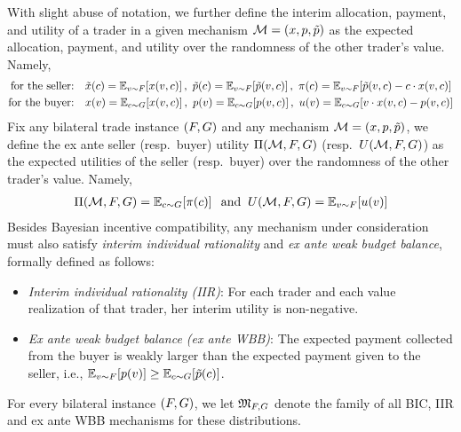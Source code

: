 With slight abuse of notation, we further define the interim allocation, payment, and utility of a trader in a given mechanism $\mathcal{M} = (x, p, \tilde{p})$ as the expected allocation, payment, and utility over the randomness of the other trader's value. Namely,
\begin{align*}
    \text{for the seller:}
    \quad
    &\selleralloc(\cost) = \expect[\val\sim\buyerdist]{\alloc(\val, \cost)},~
    \sellerprice(\cost) = \expect[\val\sim\buyerdist]{\sellerprice(\val, \cost)},~
    \sellerutil(\cost) = \expect[\val\sim\buyerdist]{\sellerprice(\val,\cost) - \cost \cdot \alloc(\val,\cost)}
    \\
    \text{for the buyer:}
    \quad
    &\alloc(\val) = \expect[\cost\sim\sellerdist]{\alloc(\val,\cost)},~
    \price(\val) = \expect[\cost\sim\sellerdist]{\price(\val, \cost)},~
    \buyerutil(\val) = \expect[\cost\sim\sellerdist]{\val\cdot \alloc(\val,\cost) - \price(\val,\cost)}
\end{align*}
Fix any bilateral trade instance $(F,G)$ and any mechanism $\mathcal{M} = (x,p,\tilde{p})$, we define the ex ante seller (resp.\ buyer) utility $\Pi(\mathcal{M},F,G)$ (resp.\ $U(\mathcal{M},F,G)$) as the expected utilities of the seller (resp.\ buyer) over the randomness of the other trader's value. Namely,
\begin{align*}
    \sellerexanteutil(\mech,\buyerdist,\sellerdist) = \expect[\cost\sim\sellerdist]{\sellerutil(\cost)}
    \;\;\mbox{and}\;\;
    \buyerexanteutil(\mech,\buyerdist,\sellerdist) =  \expect[\val\sim\buyerdist]{\buyerutil(\val)}
\end{align*}
Besides Bayesian incentive compatibility, any mechanism under consideration must also satisfy \emph{interim individual rationality} and \emph{ex ante weak budget balance}, formally defined as follows:
\begin{itemize}
    \item \emph{Interim individual rationality (IIR)}: For each trader and each value realization {of that trader}, her interim utility is non-negative.
    \item \emph{Ex ante weak budget balance (ex ante WBB)}: The expected payment collected from the buyer is weakly larger than the expected payment given to the seller, i.e., $\expect[\val\sim\buyerdist]{\price(\val)} \geq \expect[\cost\sim\sellerdist]{\sellerprice(\cost)}$.
\end{itemize}
For every bilateral instance $(F,G)$, we let $\mathfrak{M}_{F,G}$ denote the family of all BIC, IIR  and ex ante WBB mechanisms for these distributions. 


